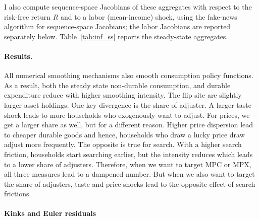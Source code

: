 I also compute sequence-space Jacobians of these aggregates with respect to the risk-free return $R$ and to a labor (mean-income) shock, using the fake-news algorithm for sequence-space Jacobians; the labor Jacobians are reported separately below. Table~\ref{tab:inf_ss} reports the steady-state aggregates.

\begin{table}[htbp]
\centering
\caption{Infinite-horizon steady-state aggregates: EV taste shocks $\sigma_\varepsilon$, and search+price with either $\sigma_p$ varied at $S=0.2$ or $S$ varied at $\sigma_p=0.1$.}
\label{tab:inf_ss}
\footnotesize

\end{table}

\paragraph{Results.}

All numerical smoothing mechanisms also smooth consumption policy functions. As a result, both the steady state non-durable consumption, and durable expenditure reduce with higher smoothing intensity. The flip site are slightly larger asset holdings. One key divergence is the share of adjuster. A larger taste shock leads to more households who exogenously want to adjust. For prices, we get a larger share as well, but for a different reason. Higher price dispersion lead to cheaper durable goods and hence, households who draw a lucky price draw adjust more frequently. The opposite is true for search. With a higher search friction, households start searching earlier, but the intensity reduces which leads to a lower share of adjusters. Therefore, when we want to target MPC or MPX, all three measures lead to a dampened number. But when we also want to target the share of adjusters, taste and price shocks lead to the opposite effect of search frictions.

\paragraph{Kinks and Euler residuals}
\label{subsec:ModelBasicEuler}

